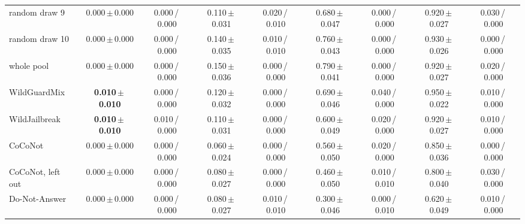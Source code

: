 \begin{tabular}{@{}lcccccccc@{}}
random draw 9 & 0.000\,{\scriptsize$\pm$\,0.000} & {\scriptsize 0.000\,/\,0.000} & 0.110\,{\scriptsize$\pm$\,0.031} & {\scriptsize 0.020\,/\,0.010} & 0.680\,{\scriptsize$\pm$\,0.047} & {\scriptsize 0.000\,/\,0.000} & 0.920\,{\scriptsize$\pm$\,0.027} & {\scriptsize 0.030\,/\,0.000} \\
random draw 10 & 0.000\,{\scriptsize$\pm$\,0.000} & {\scriptsize 0.000\,/\,0.000} & 0.140\,{\scriptsize$\pm$\,0.035} & {\scriptsize 0.010\,/\,0.010} & 0.760\,{\scriptsize$\pm$\,0.043} & {\scriptsize 0.000\,/\,0.000} & 0.930\,{\scriptsize$\pm$\,0.026} & {\scriptsize 0.000\,/\,0.000} \\
whole pool & 0.000\,{\scriptsize$\pm$\,0.000} & {\scriptsize 0.000\,/\,0.000} & 0.150\,{\scriptsize$\pm$\,0.036} & {\scriptsize 0.000\,/\,0.000} & 0.790\,{\scriptsize$\pm$\,0.041} & {\scriptsize 0.000\,/\,0.000} & 0.920\,{\scriptsize$\pm$\,0.027} & {\scriptsize 0.020\,/\,0.000} \\
WildGuardMix & \textbf{0.010\,{\scriptsize$\pm$\,0.010}} & {\scriptsize 0.000\,/\,0.000} & 0.120\,{\scriptsize$\pm$\,0.032} & {\scriptsize 0.000\,/\,0.000} & 0.690\,{\scriptsize$\pm$\,0.046} & {\scriptsize 0.040\,/\,0.000} & 0.950\,{\scriptsize$\pm$\,0.022} & {\scriptsize 0.010\,/\,0.000} \\
WildJailbreak & \textbf{0.010\,{\scriptsize$\pm$\,0.010}} & {\scriptsize 0.010\,/\,0.000} & 0.110\,{\scriptsize$\pm$\,0.031} & {\scriptsize 0.000\,/\,0.000} & 0.600\,{\scriptsize$\pm$\,0.049} & {\scriptsize 0.020\,/\,0.000} & 0.920\,{\scriptsize$\pm$\,0.027} & {\scriptsize 0.010\,/\,0.000} \\
CoCoNot & 0.000\,{\scriptsize$\pm$\,0.000} & {\scriptsize 0.000\,/\,0.000} & 0.060\,{\scriptsize$\pm$\,0.024} & {\scriptsize 0.000\,/\,0.000} & 0.560\,{\scriptsize$\pm$\,0.050} & {\scriptsize 0.020\,/\,0.000} & 0.850\,{\scriptsize$\pm$\,0.036} & {\scriptsize 0.000\,/\,0.000} \\
CoCoNot, left out & 0.000\,{\scriptsize$\pm$\,0.000} & {\scriptsize 0.000\,/\,0.000} & 0.080\,{\scriptsize$\pm$\,0.027} & {\scriptsize 0.000\,/\,0.000} & 0.460\,{\scriptsize$\pm$\,0.050} & {\scriptsize 0.010\,/\,0.010} & 0.800\,{\scriptsize$\pm$\,0.040} & {\scriptsize 0.030\,/\,0.000} \\
Do-Not-Answer & 0.000\,{\scriptsize$\pm$\,0.000} & {\scriptsize 0.000\,/\,0.000} & 0.080\,{\scriptsize$\pm$\,0.027} & {\scriptsize 0.010\,/\,0.010} & 0.300\,{\scriptsize$\pm$\,0.046} & {\scriptsize 0.000\,/\,0.010} & 0.620\,{\scriptsize$\pm$\,0.049} & {\scriptsize 0.010\,/\,0.000} \\

\end{tabular}
